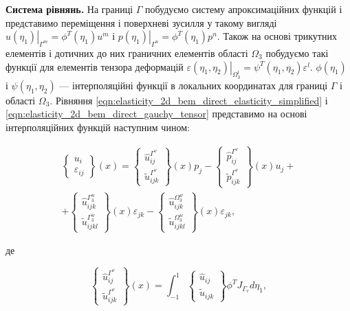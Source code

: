 \textbf{Система рівнянь.} На границі $\Gamma$ побудуємо систему апроксимаційних функцій і представимо переміщення і 
поверхневі зусилля у такому вигляді $\left.u(\eta_1)\right|_{\Gamma^m} = \phi^T(\eta_1)u^m$ і 
$\left.p(\eta_1)\right|_{\Gamma^n} = \phi^T(\eta_1)p^n$. Також на основі трикутних елементів і дотичних до них граничних 
елементів області $\Omega_3$ побудуємо такі функції для елементів тензора деформацій 
$\left.\varepsilon(\eta_1, \eta_2)\right|_{\Omega_3^l} = \psi^T(\eta_1,\eta_2)\varepsilon^l$. $\phi(\eta_1)$ і 
$\psi(\eta_1, \eta_2)$ --- інтерполяційні функції в локальних координатах для границі $\Gamma$ і області $\Omega_3$. 
Рівняння \ref{eqn:elasticity_2d_bem_direct_elasticity_simplified} і \ref{eqn:elasticity_2d_bem_direct_gauchy_tensor} 
представимо на основі інтерполяційних функцій наступним чином:

\begin{equation}
    \begin{split}
        \left\{ \begin{array}{lr} u_i \\ \varepsilon_{ij}\end{array} \right\}(x) =  
        \left\{ \begin{array}{lr} \hat{u}_{ij}^{\Gamma^v} \\ \tilde{u}_{ijk}^{\Gamma^v} \end{array} \right\}(x) p_j -
        \left\{ \begin{array}{lr} \hat{p}_{ij}^{\Gamma^v} \\ \tilde{p}_{ijk}^{\Gamma^v} \end{array} \right\}(x) u_j + \\
        + \left\{ \begin{array}{lr} \hat{u}_{ijk}^{\Gamma_3^w} \\ \tilde{u}_{ijkl}^{\Gamma_3^w} \end{array} \right\}(x) 
        \varepsilon_{jk}  
        - \left\{ \begin{array}{lr} \hat{u}_{ijk}^{\Omega_3^w} \\ \tilde{u}_{ijkl}^{\Omega_3^w} \end{array} \right\}(x) 
        \varepsilon_{jk},  
    \end{split}
\end{equation}

\noindent де

\begin{equation*}
    \left\{ \begin{array}{lr} \hat{u}_{ij}^{\Gamma^v} \\ \tilde{u}_{ijk}^{\Gamma^v} \end{array} \right\}(x) =
    \int_{-1}^{1} \left\{ \begin{array}{lr} \hat{u}_{ij} \\ \tilde{u}_{ijk} \end{array} \right\} 
    \phi^T J_{\Gamma_v} d \eta_1,
\end{equation*}

